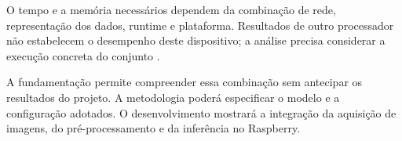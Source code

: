 O tempo e a memória necessários dependem da combinação de rede, representação dos dados, runtime e plataforma. Resultados de outro processador não estabelecem o desempenho deste dispositivo; a análise precisa considerar a execução concreta do conjunto \cite[seções V e VIII]{sze}.

A fundamentação permite compreender essa combinação sem antecipar os resultados do projeto. A metodologia poderá especificar o modelo e a configuração adotados. O desenvolvimento mostrará a integração da aquisição de imagens, do pré-processamento e da inferência no Raspberry.
